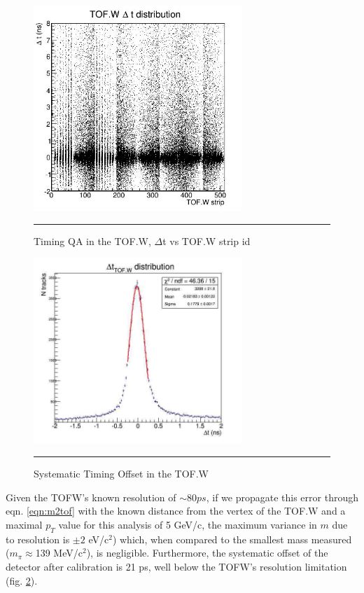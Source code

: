 \begin{figure}[htbp]
  \centering
    \includegraphics[width=0.7\textwidth]{evtQA/ttofwdist.JPG}
    \rule{35em}{0.5pt}
  \caption[Timing QA in the TOF.W]{Timing QA in the TOF.W, $\Delta$t vs TOF.W strip id}
  \label{fig:tofwdist}
\end{figure}

\begin{figure}[htbp]
  \centering
    \includegraphics[width=0.7\textwidth]{evtQA/deltattofwdist.jpg}
    \rule{35em}{0.5pt}
  \caption[Systematic Offset in TOF.W]{Systematic Timing Offset in the TOF.W}
  \label{fig:tofwsyst}
\end{figure}

Given the TOFW's known resolution of $\sim 80 ps$, if we propagate this error through eqn. \ref{eqn:m2tof} with the known distance from the vertex of the TOF.W and a maximal $p_T$ value for this analysis of 5 GeV/c, the maximum variance in $m$ due to resolution is $\pm 2$ eV/c$^2$) which, when compared to the smallest mass measured ($m_{\pi}\approx$139 MeV/c$^2$), is negligible. Furthermore, the systematic offset of the detector after calibration is 21 ps, well below the TOFW's resolution limitation (fig. \ref{fig:tofwsyst}).


